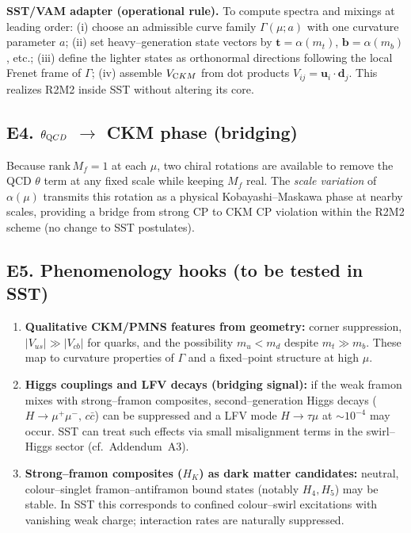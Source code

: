 \documentclass[11pt]{article}
\begin{document}
          \textbf{SST/VAM adapter (operational rule).} To compute spectra and mixings at leading order:
          (i) choose an admissible curve family $\Gamma(\mu;a)$ with one curvature parameter $a$;
          (ii) set heavy–generation state vectors by $\mathbf t=\alpha(m_t)$, $\mathbf b=\alpha(m_b)$, etc.;
          (iii) define the lighter states as orthonormal directions following the local Frenet frame of $\Gamma$;
          (iv) assemble $V_{\textrm CKM}$ from dot products $V_{ij}=\mathbf u_i\!\cdot\!\mathbf d_j$.
          This realizes R2M2 inside SST without altering its core.

      \subsection*{E4. $\theta_{\textrm QCD}$ $\rightarrow$ CKM phase (bridging)}
          Because $\mathrm{rank}\,M_f=1$ at each $\mu$, two chiral rotations are available to remove the QCD $\theta$ term at any fixed scale while keeping $M_f$ real. The \emph{scale variation} of $\alpha(\mu)$ transmits this rotation as a physical Kobayashi–Maskawa phase at nearby scales, providing a bridge from strong CP to CKM CP violation within the R2M2 scheme (no change to SST postulates).

      \subsection*{E5. Phenomenology hooks (to be tested in SST)}
          \begin{enumerate}
          \item \textbf{Qualitative CKM/PMNS features from geometry:} corner suppression, $|V_{us}|\gg|V_{cb}|$ for quarks, and the possibility $m_u<m_d$ despite $m_t\!\gg\!m_b$. These map to curvature properties of $\Gamma$ and a fixed–point structure at high $\mu$.
          \item \textbf{Higgs couplings and LFV decays (bridging signal):} if the weak framon mixes with strong–framon composites, second–generation Higgs decays ($H\!\to\!\mu^+\mu^-,\,c\bar c$) can be suppressed and a LFV mode $H\!\to\!\tau\mu$ at $\sim 10^{-4}$ may occur. SST can treat such effects via small misalignment terms in the swirl–Higgs sector (cf.\ Addendum~A3).
          \item \textbf{Strong–framon composites ($H_K$) as dark matter candidates:} neutral, colour–singlet framon–antiframon bound states (notably $H_4, H_5$) may be stable. In SST this corresponds to confined colour–swirl excitations with vanishing weak charge; interaction rates are naturally suppressed.
          \end{enumerate}
\end{document}

